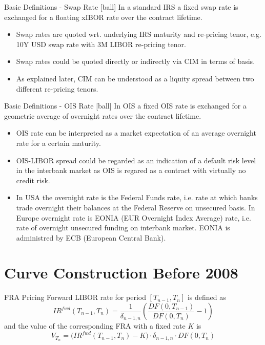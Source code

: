 \documentclass{beamer}
\begin{document}
\begin{frame}{Basic Definitions - Swap Rate}
[ball]
In a standard IRS a fixed swap rate is exchanged for a floating xIBOR rate over the contract lifetime.
\begin{itemize}
\item Swap rates are quoted wrt. underlying IRS maturity and re-pricing tenor, e.g. 10Y USD swap rate with 3M LIBOR re-pricing tenor.
\item Swap rates could be quoted directly or indirectly via CIM in terms of basis.
\item As explained later, CIM can be understood as a liquity spread between two different re-pricing tenors.
\end{itemize}
\end{frame}

\begin{frame}{Basic Definitions - OIS Rate}
[ball]
In OIS a fixed OIS rate is exchanged for a geometric average of overnight rates over the contract lifetime.
\begin{itemize}
\item OIS rate can be interpreted as a market expectation of an average overnight rate for a certain maturity.
\item OIS-LIBOR spread could be regarded as an indication of a default risk level in the interbank market as OIS is regared as a contract with virtually no credit risk.
\item In USA the overnight rate is the Federal Funds rate, i.e. rate at which banks trade overnight their balances at the Federal Reserve on unsecured basis. In Europe overnight rate is EONIA (EUR Overnight Index Average) rate, i.e. rate of overnight unsecured funding on interbank market. EONIA is administred by ECB (European Central Bank).
\end{itemize}
\end{frame}

\section{Curve Construction Before 2008}

\begin{frame}{FRA Pricing}
Forward LIBOR rate for period $[T_{n-1}, T_n]$ is defined as
\begin{equation*}
IR^{fwd}(T_{n-1}, T_n) = \frac{1}{\delta_{n-1, n}} \left(\frac{DF(0, T_{n-1})}{DF(0, T_n)} - 1\right)
\end{equation*}
and the value of the corresponding FRA with a fixed rate $K$ is
\begin{equation*}
V_{T_n} = \big(IR^{fwd}(T_{n-1}, T_n) - K \big) \cdot \delta_{n-1, n} \cdot DF(0, T_n)
\end{equation*}
\end{frame}
\end{document}
